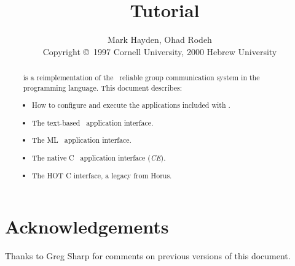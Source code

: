 \documentclass[11pt]{article}
\title{\ensemble\ Tutorial}
\author{Mark Hayden, Ohad Rodeh \\
\small{Copyright \copyright\ 1997 Cornell University,
                             2000 Hebrew  University}
}
\begin{document}
\maketitle

\begin{abstract}
\ensemble\ is a reimplementation of the \horus\ reliable group communication
system in the \caml\ programming language.  This document describes:
\begin{itemize}
\item
How to configure and execute the applications included with \ensemble.
\item
The text-based \ensemble\ application interface.
\item
The ML \ensemble\ application interface.
\item
The native C \ensemble\ application interface ({\it CE}).
\item 
The HOT C interface, a legacy from Horus.
\end{itemize}
\end{abstract}

\newpage
\tableofcontents
\newpage




%







\section*{Acknowledgements}
Thanks to Greg Sharp for comments on previous versions of this document.
\end{document}
